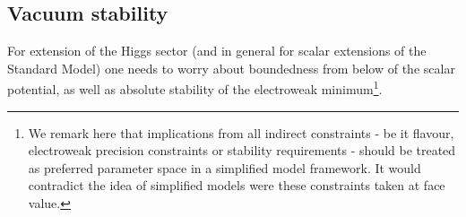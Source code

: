 \subsection{Vacuum stability}
\label{sub:vacuumStability}
    
    For extension of the Higgs sector (and in general for scalar extensions of the Standard Model) one needs to worry about 
    boundedness from below of the scalar potential, as well as absolute stability of the electroweak minimum\footnote{We remark 
    here that implications from all indirect constraints - be it flavour, electroweak precision constraints or stability 
    requirements -  should be treated as preferred parameter space in a simplified model framework. It would contradict the idea of simplified
models were these constraints taken at face value.}.  

